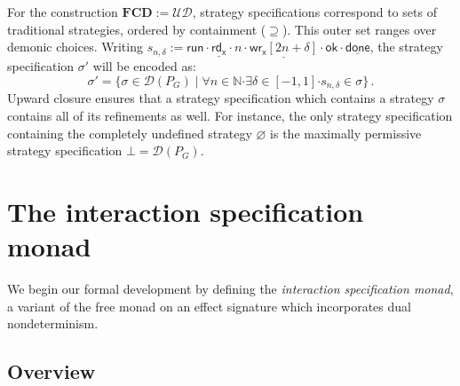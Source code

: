 \documentclass[draft,11pt]{report}
\newcommand{\kw}[1]{\ensuremath{ \mathsf{#1} }}
\newcommand{\bdot}{\boldsymbol{\cdot}}
\begin{document}
For the construction $\mathbf{FCD} := \mathcal{U} \mathcal{D}$,
strategy specifications correspond to
sets of traditional strategies,
ordered by containment ($\supseteq$).
This outer set ranges over demonic choices.
Writing
$
  s_{n,\delta} :=
        \kw{run} \cdot
        \underline{\kw{rd}_\kw{x}} \cdot n \cdot
        \underline{\kw{wr}_\kw{x}[2n + \delta]} \cdot \kw{ok} \cdot
        \underline{\kw{done}} %
$,
the strategy specification $\sigma'$
will be encoded as:
\[
  \sigma' =
  \{ \sigma \in \mathcal{D}(P_G) \mid
     \forall n \in \mathbb{N} \bdot
     \exists \delta \in [-1,1] \bdot
     s_{n,\delta} \in \sigma \} \,.
\]
Upward closure ensures that a strategy specification
which contains a strategy $\sigma$
contains all of its refinements as well.
For instance,
the only strategy specification
containing the completely undefined strategy $\varnothing$
is the maximally permissive strategy specification $\bot = \mathcal{D}(P_G)$.


%
%



\chapter{The interaction specification monad} \label{sec:intspec} %

We begin our formal development
by defining the \emph{interaction specification monad},
a variant of the free monad on an effect signature which
incorporates dual nondeterminism.

\section{Overview} %
\end{document}
